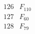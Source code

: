 \documentclass{article}
\begin{document}
{$$\begin{array}{|r|*{7}{r|}}
 & 
 & 
\\
\hline
126 
 & F_{110} &
 & 
 & 
 & 
 & 
 & 
\\
\hline
127 
 & F_{60} &
 & 
 & 
 & 
 & 
 & 
\\
\hline
128 
 & F_{79} &
 & 

\end{array}$$}
\end{document}

